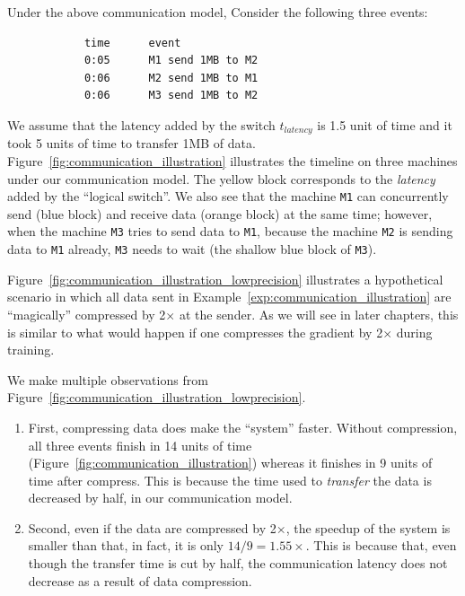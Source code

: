 \begin{example} \label{exp:communication_illustration}
Under the above communication model,
Consider the following three events:
\begin{verbatim}
            time      event
            0:05      M1 send 1MB to M2
            0:06      M2 send 1MB to M1
            0:06      M3 send 1MB to M2
\end{verbatim}
We assume that the latency added by the switch $t_{latency}$
is 1.5 unit of time and it took 5 units of time to
transfer 1MB of data. 
Figure~\ref{fig:communication_illustration} illustrates 
the timeline on three machines under our communication 
model. The yellow block corresponds to the {\em latency}
added by the ``logical switch''. We also see that 
the machine \texttt{M1} can concurrently send (blue
block) and
receive data (orange block) at the same time; however,
when the machine \texttt{M3} tries to send data to
\texttt{M1}, because the machine \texttt{M2} is
sending data to \texttt{M1} already, \texttt{M3}
needs to wait (the shallow blue block of \texttt{M3}).
\end{example}

\begin{example} \label{exp:communication_illustration}
Figure~\ref{fig:communication_illustration_lowprecision}
illustrates a hypothetical scenario in which 
all data sent in Example~\ref{exp:communication_illustration}
are ``magically'' compressed by 2$\times$ at the sender.
As we will see in later chapters, this is similar to what 
would happen if one compresses the gradient by 2$\times$
during training.

We make multiple observations from Figure~\ref{fig:communication_illustration_lowprecision}.
\begin{enumerate}
\item First, compressing data does make the ``system'' faster.
Without compression, all three events finish in 14 units
of time (Figure~\ref{fig:communication_illustration})
whereas it finishes in 9 units of time after compress.
This is because the time used to {\em transfer}
the data is decreased by half, in our communication model.
\item Second, even if the data are compressed by 2$\times$,
the speedup of the system is smaller than that, in fact, it
is only $14/9 = 1.55\times$. This is because that, even 
though the transfer time is cut by half, the communication
latency does not decrease as a result of data compression.
\end{enumerate}
\end{example}


